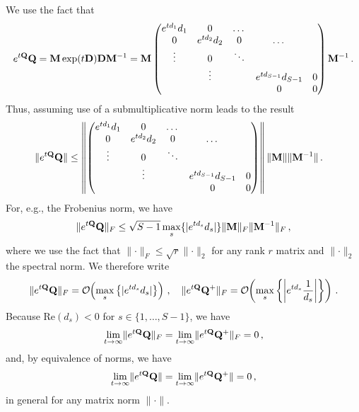\documentclass[12pt]{article} %
\newcommand{\order}[1]{{\cal O}\hspace{-0.2em}\left( #1 \right)}
\begin{document}
We use the fact that
\begin{align*}
	e^{t\mathbf{Q}}\mathbf{Q} = \mathbf{M} \exp(t\mathbf{D}) \mathbf{D} \mathbf{M}^{-1} =  \mathbf{M} \begin{pmatrix}
	e^{td_1}	d_1& 0 &\dots & & \\
		0  & e^{td_2}d_2 &0  & \dots& \\
		\vdots &0 & \ddots & \\
		& \vdots& & e^{td_{S-1}}d_{S-1} &0 \\
		&&&0&0
	\end{pmatrix} \mathbf{M}^{-1} \, .
\end{align*}
Thus, assuming use of a submultiplicative norm leads to the result
\begin{align*}
	\lVert e^{t\mathbf{Q}}\mathbf{Q} \rVert &\leq \left\Vert  \begin{pmatrix}
		e^{td_1}	d_1& 0 &\dots & & \\
		0  & e^{td_2}d_2 &0  & \dots& \\
		\vdots &0 & \ddots & \\
		& \vdots& & e^{td_{S-1}}d_{S-1} &0 \\
		&&&0&0
	\end{pmatrix}  \right\Vert  \lVert \mathbf{M}\rVert   \lVert \mathbf{M}^{-1}\rVert  \, .
\end{align*}
For, e.g., the Frobenius norm, we have
\begin{align*}
\lVert e^{t\mathbf{Q}}\mathbf{Q} \rVert_F	\leq \sqrt{S-1} \max_s \{|e^{td_{s}} d_{s}| \}  \lVert \mathbf{M}\rVert_F   \lVert \mathbf{M}^{-1}\rVert_F  \, ,
\end{align*}
where we  use the fact that $\lVert \cdot \rVert_F \leq \sqrt{r} \lVert \cdot \rVert_2$ for any rank $r$ matrix and $\lVert \cdot \rVert_2$ the spectral norm.  We therefore write
\begin{align}
	\lVert e^{t\QQ}\QQ \rVert_F = \order{\max_s \left\{|e^{td_{s}} d_{s}| \right\}} \,,  \quad 	\lVert e^{t\QQ}\QQ^+ \rVert_F = \order{\max_s \left\{ \left| e^{td_{s}} \frac{1}{d_{s}}\right| \right\}} \, .
\end{align}
Because $\mbox{Re}(d_s)<0$ for $s\in \{1,\dots,S-1\}$, we have
\begin{align}
	\lim_{t\rightarrow \infty}  	\lVert e^{t\mathbf{Q}}\mathbf{Q} \rVert_F = 	\lim_{t\rightarrow \infty}  	\lVert e^{t\mathbf{Q}}\mathbf{Q}^+ \rVert_F = 0\, ,
\end{align}
and, by equivalence of norms, we have
\begin{align}
	\lim_{t\rightarrow \infty}  	\lVert e^{t\mathbf{Q}}\mathbf{Q} \rVert = 	\lim_{t\rightarrow \infty}  	\lVert e^{t\mathbf{Q}}\mathbf{Q}^+ \rVert = 0\, ,
\end{align}
in general for any matrix norm $\lVert \cdot \rVert$.
\end{document}
